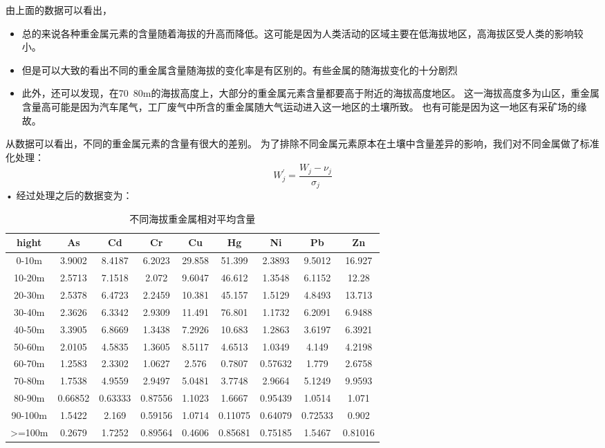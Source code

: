 \documentclass[a4paper]{article}
\begin{document}
由上面的数据可以看出，
\begin{itemize}
\item 总的来说各种重金属元素的含量随着海拔的升高而降低。这可能是因为人类活动的区域主要在低海拔地区，高海拔区受人类的影响较小。
\item 但是可以大致的看出不同的重金属含量随海拔的变化率是有区别的。有些金属的随海拔变化的十分剧烈
\item 此外，还可以发现，在70~80m的海拔高度上，大部分的重金属元素含量都要高于附近的海拔高度地区。
这一海拔高度多为山区，重金属含量高可能是因为汽车尾气，工厂废气中所含的重金属随大气运动进入这一地区的土壤所致。
也有可能是因为这一地区有采矿场的缘故。

\end{itemize}
从数据可以看出，不同的重金属元素的含量有很大的差别。
为了排除不同金属元素原本在土壤中含量差异的影响，我们对不同金属做了标准化处理：
\begin{equation}
W_j^{\prime} = \frac{W_j - \nu_j}{\sigma_j}
\end{equation}•
经过处理之后的数据变为：
\begin{table}[H]
		\centering
		\caption{不同海拔重金属相对平均含量}
		\label{average-contend}
		\begin{tabular}{c|cccccccc}
			hight	  &          	As	&   Cd   &     Cr     &   Cu   &     Hg  &    Ni   &     Pb    &   Zn  \\
			\hline
			 0-10m     	&	 3.9002  &   8.4187   &  6.2023  &  29.858  &   51.399  &   2.3893  &   9.5012  &   16.927    \\
    			10-20m     	&	 2.5713  &   7.1518   &   2.072  &  9.6047  &   46.612  &   1.3548  &   6.1152  &    12.28    \\
   			20-30m    	&	 2.5378  &   6.4723   &  2.2459  &  10.381  &   45.157  &   1.5129  &   4.8493  &   13.713    \\
    			30-40m     	&	 2.3626  &   6.3342   &  2.9309  &  11.491  &   76.801  &   1.1732  &   6.2091  &   6.9488    \\
    			40-50m     	&	 3.3905  &   6.8669   &  1.3438  &  7.2926  &   10.683  &   1.2863  &   3.6197  &   6.3921    \\
    			50-60m      	&	 2.0105  &   4.5835   &  1.3605  &  8.5117  &   4.6513  &   1.0349  &    4.149  &   4.2198    \\
    			60-70m     	&	 1.2583  &   2.3302   &  1.0627  &   2.576  &   0.7807  &  0.57632  &    1.779  &   2.6758    \\
    			70-80m     	&	 1.7538  &   4.9559   &  2.9497  &  5.0481  &   3.7748  &   2.9664  &   5.1249  &   9.9593    \\
    			80-90m     	&	 0.66852 &   0.63333  &  0.87556 &   1.1023 &    1.6667 &   0.95439 &    1.0514 &     1.071   \\
    			90-100m    	&	 1.5422  &    2.169   & 0.59156  &  1.0714  &  0.11075  &  0.64079  &  0.72533  &    0.902    \\
    			>=100m    	&	 0.2679  &   1.7252   & 0.89564  &  0.4606  &  0.85681  &  0.75185  &   1.5467  &  0.81016    \\
		\end{tabular}
	\end{table}
\end{document}
